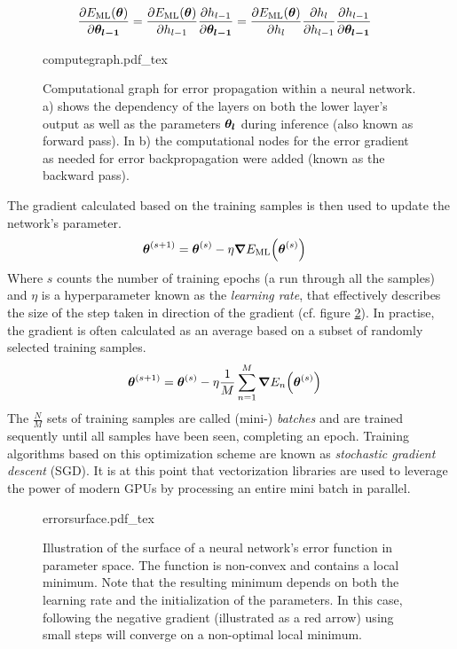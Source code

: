 \begin{align}
    \pdv{E_{\mathrm{ML}}\qty(\vb*{\theta})}{\vb*{\theta_{l-1}}} &= \pdv{E_{\mathrm{ML}}\qty(\vb*{\theta})}{h_{l-1}} \pdv{h_{l-1}}{\vb*{\theta_{l-1}}} = \pdv{E_{\mathrm{ML}}\qty(\vb*{\theta})}{h_l}\pdv{h_l}{h_{l-1}} \pdv{h_{l-1}}{\vb*{\theta_{l-1}}}
\end{align}
\begin{figure}
    \centering
\def\svgwidth{\textwidth}
{computegraph.pdf_tex}
\caption[Computational graph for error propagation]{Computational graph for error propagation within a neural network. a) shows the dependency of the layers on both the lower layer's output as well as the parameters $\vb*{\theta_l}$ during inference (also known as forward pass). In b) the computational nodes for the error gradient as needed for error backpropagation were added (known as the backward pass).}\label{fig:computegraph}
\end{figure}\noindent
The gradient calculated based on the training samples is then used to update the network's parameter.
\begin{align}
    \vb*{\theta}^{(s+1)} &= \vb*{\theta}^{(s)}-\eta \grad{E_{\mathrm{ML}}\qty(\vb*{\theta}^{(s)})}
\end{align}
Where $s$ counts the number of training epochs (a run through all the samples) and $\eta$ is a hyperparameter known as the \emph{learning rate}, that effectively describes the size of the step taken in direction of the gradient (cf. figure \ref{fig:errorsurf}). In practise, the gradient is often calculated as an average based on a subset of randomly selected training samples.
\begin{align}
    \vb*{\theta}^{(s+1)} &= \vb*{\theta}^{(s)}-\eta\frac{1}{M} \sum_{n=1}^M\grad{E_n\qty(\vb*{\theta}^{(s)})}
\end{align}
The $\frac{N}{M}$ sets of training samples are called (mini-) \emph{batches} and are trained sequently until all samples have been seen, completing an epoch. Training algorithms based on this optimization scheme are known as \emph{stochastic gradient descent} (SGD). It is at this point that vectorization libraries are used to leverage the power of modern GPUs by processing an entire mini batch in parallel.
\begin{figure}
    \centering
\def\svgwidth{.5\textwidth}
{errorsurface.pdf_tex}
\caption[Illustration of a neural network's error function]{Illustration of the surface of a neural network's error function in parameter space. The function is non-convex and contains a local minimum. Note that the resulting minimum depends on both the learning rate and the initialization of the parameters. In this case, following the negative gradient (illustrated as a red arrow) using small steps will converge on a non-optimal local minimum.}
\label{fig:errorsurf}
\end{figure}\noindent

